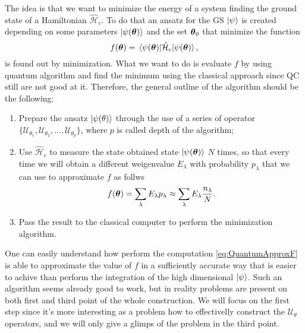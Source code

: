 The idea is that we want to minimize the energy of a system finding the ground state of a Hamiltonian $\hat{\mathcal{H}}_c$. To do that an ansatz for the GS $\ket{\psi}$ is created depending on some parameters $\ket{\psi(\vb*{\theta})}$ and the set $\vb*{\theta}_0$ that minimize the function
\begin{equation}
    f(\vb*{\theta}) = \ev{\hat{\mathcal{H}}_c}{\psi(\vb*{\theta})},
\end{equation}
is found out by minimization. What we want to do is evaluate $f$ by using quantum algorithm and find the minimum using the classical approach since QC still are not good at it. Therefore, the general outline of the algorithm should be the following:
\begin{enumerate}[label*=\protect\fbox{\arabic{enumi}}]
    \item Prepare the ansatz $\ket{\psi(\theta)}$ through the use of a series of operator $\{\mathcal{U}_{\theta_1}, \mathcal{U}_{\theta_2}, \dots, \mathcal{U}_{\theta_p}\}$, where $p$ is called depth of the algorithm;
    \item Use $\hat{\mathcal{H}}_c$ to measure the state obtained state $\ket{\psi(\vb*{\theta})}$ $N$ times, so that every time we will obtain a different weigenvalue $E_\lambda$ with probability $p_\lambda$ that we can use to approximate $f$ as follws
    \begin{equation}
        \label{eq:QuantumApproxF}
        f(\vb*{\theta}) = \sum_\lambda E_\lambda p_\lambda \approx \sum_\lambda E_\lambda \frac{n_\lambda}{N}.    
    \end{equation} 
    \item Pass the result to the classical computer to perform the minimization algorithm.
\end{enumerate}
One can easily understand how perform the computation \eqref{eq:QuantumApproxF} is able to approximate the value of $f$ in a sufficiently accurate way that is easier to achive than perform the integration of the high dimensional $\ket{\psi}$. Such an algorithm seems already good to work, but in reality problems are present on both first and third point of the whole construction. We will focus on the first step since it's more interesting as a problem how to effectivelly construct the $\mathcal{U}_{\theta}$ operators, and we will only give a glimps of the problem in the third point.

